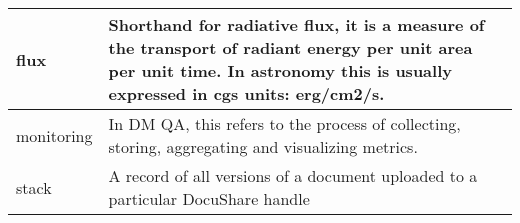 \begin{longtable}{|l|p{}|}
flux & Shorthand for radiative flux, it is a measure of the transport of radiant energy per unit area per unit time. In astronomy this is usually expressed in cgs units: erg/cm2/s. \\\hline
monitoring & In DM QA, this refers to the process of collecting, storing, aggregating and visualizing metrics. \\\hline
stack & A record of all versions of a document uploaded to a particular DocuShare handle \\\hline
\end{longtable}
